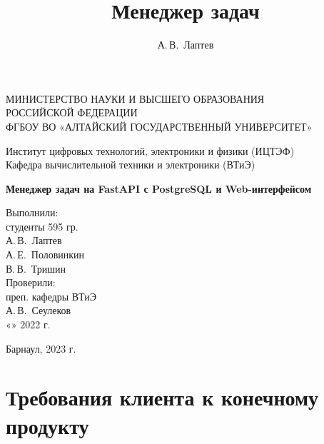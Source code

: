 \documentclass{altsu-report}
\title{Менеджер задач}
\author{А.\,В.~Лаптев}
\institute{Институт цифровых технологий, электроники и физики}
\date{\the\year}
\begin{document}
\begin{titlepage}
 \begin{center}
    \normalsize
    МИНИСТЕРСТВО НАУКИ И ВЫСШЕГО ОБРАЗОВАНИЯ \\
    РОССИЙСКОЙ ФЕДЕРАЦИИ \\
    ФГБОУ ВО «АЛТАЙСКИЙ ГОСУДАРСТВЕННЫЙ УНИВЕРСИТЕТ»
    \vfill
     
    Институт цифровых технологий, электроники и физики (ИЦТЭФ) \\
    Кафедра вычислительной техники и электроники (ВТиЭ)
    \vfill
     
    \textbf{Менеджер задач на FastAPI с PostgreSQL и Web-интерфейсом} \\
 \end{center}
\vfill
 
\newlength{\ML}
\hfill\begin{minipage}{0.41\textwidth}
  Выполнили:\\
  студенты 595 гр.\\
  \underline{\hspace{\ML}} А.\,В.~Лаптев \\
  \underline{\hspace{\ML}} А.\,Е.~Половинкин \\
  \underline{\hspace{\ML}} В.\,В.~Тришин \\
  Проверили:\\
  преп. кафедры ВТиЭ\\
  \underline{\hspace{\ML}} А.\,В.~Сеулеков \\
  «\underline{\hspace{1cm}}» \underline{\hspace{3cm}} 2022 г.
\end{minipage}%
\vfill
 
\begin{center}
  Барнаул, 2023 г.
\end{center}
\end{titlepage}

\setcounter{page}{2}
\tableofcontents

\chapter*{Требования клиента к конечному продукту}
\end{document}
